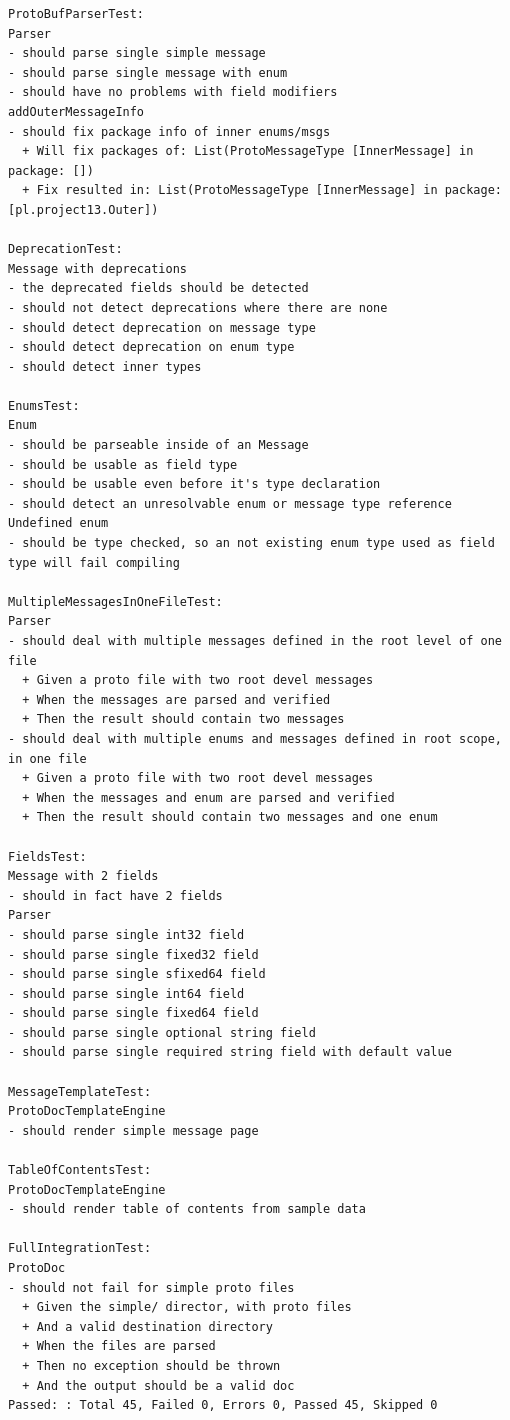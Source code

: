 \documentclass[pdflatex,11pt]{aghdpl}
\begin{document}
\begin{verbatim}
ProtoBufParserTest:
Parser 
- should parse single simple message
- should parse single message with enum
- should have no problems with field modifiers
addOuterMessageInfo 
- should fix package info of inner enums/msgs
  + Will fix packages of: List(ProtoMessageType [InnerMessage] in package: []) 
  + Fix resulted in: List(ProtoMessageType [InnerMessage] in package: [pl.project13.Outer]) 

DeprecationTest:
Message with deprecations 
- the deprecated fields should be detected
- should not detect deprecations where there are none
- should detect deprecation on message type
- should detect deprecation on enum type
- should detect inner types

EnumsTest:
Enum 
- should be parseable inside of an Message
- should be usable as field type
- should be usable even before it's type declaration
- should detect an unresolvable enum or message type reference
Undefined enum 
- should be type checked, so an not existing enum type used as field type will fail compiling

MultipleMessagesInOneFileTest:
Parser 
- should deal with multiple messages defined in the root level of one file
  + Given a proto file with two root devel messages 
  + When the messages are parsed and verified 
  + Then the result should contain two messages 
- should deal with multiple enums and messages defined in root scope, in one file
  + Given a proto file with two root devel messages 
  + When the messages and enum are parsed and verified 
  + Then the result should contain two messages and one enum 

FieldsTest:
Message with 2 fields 
- should in fact have 2 fields
Parser 
- should parse single int32 field
- should parse single fixed32 field
- should parse single sfixed64 field
- should parse single int64 field
- should parse single fixed64 field
- should parse single optional string field
- should parse single required string field with default value

MessageTemplateTest:
ProtoDocTemplateEngine 
- should render simple message page

TableOfContentsTest:
ProtoDocTemplateEngine 
- should render table of contents from sample data

FullIntegrationTest:
ProtoDoc 
- should not fail for simple proto files
  + Given the simple/ director, with proto files 
  + And a valid destination directory 
  + When the files are parsed 
  + Then no exception should be thrown 
  + And the output should be a valid doc 
Passed: : Total 45, Failed 0, Errors 0, Passed 45, Skipped 0

\end{verbatim}
\end{document}
